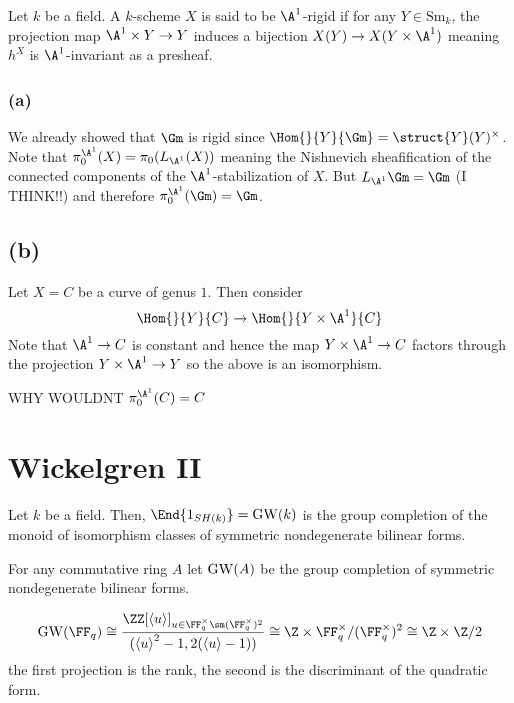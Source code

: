 \documentclass{article}
\newcommand{\Sm}{\mathrm{Sm}}
\begin{document}
Let $k$ be a field. A $k$-scheme $X$ is said to be $\A^1$-rigid if for any $Y \in \Sm_k$, the projection map $\A^1 \times Y \to Y$ induces a bijection $X(Y) \to X(Y \times \A^1)$ meaning $h^X$ is $\A^1$-invariant as a presheaf.

\subsubsection{(a)}

We already showed that $\Gm$ is rigid since $\Hom{}{Y}{\Gm} = \struct{Y}(Y)^\times$. Note that $\pi_0^{\A^1}(X) = \pi_0(L_{\A^1}(X))$ meaning the Nishnevich sheafification of the connected components of the $\A^1$-stabilization of $X$. But $L_{\A^1} \Gm = \Gm$ (I THINK!!) and therefore $\pi_0^{\A^1}(\Gm) = \Gm$.

\subsection{(b)}

Let $X = C$ be a curve of genus $1$. Then consider
\[ \Hom{}{Y}{C} \to \Hom{}{Y \times \A^1}{C} \]
Note that $\A^1 \to C$ is constant and hence the map $Y \times \A^1 \to C$ factors through the projection $Y \times \A^1 \to Y$ so the above is an isomorphism.


{\color{red} WHY WOULDNT $\pi_0^{\A^1}(C) = C$}

\section{Wickelgren II}

\begin{theorem}[Morel]
Let $k$ be a field. Then,
$\End{1_{SH(k)}} = \GW(k)$ is the group completion of the monoid of isomorphism classes of symmetric nondegenerate bilinear forms. 
\end{theorem}

\begin{defn}
For any commutative ring $A$ let $\mathrm{GW}(A)$ be the group completion of symmetric nondegenerate bilinear forms.
\end{defn}

\begin{example}
\[ \GW(\FF_q) \cong \frac{\ZZ[\left< u \right>]_{u \in \FF_q^\times \sm (\FF_q^\times)^2}}{(\left<u\right>^2 - 1, 2 (\left< u \right> - 1))} \cong \Z \times \FF_q^\times / (\FF_q^\times)^2 \cong \Z \times \Z / 2 \]
the first projection is the rank, the second is the discriminant of the quadratic form.
\end{example}
\end{document}
